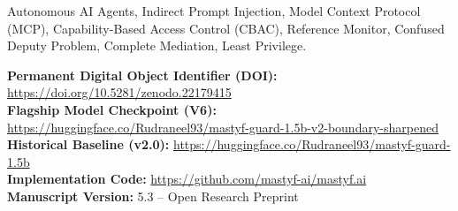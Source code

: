 \documentclass[10pt,journal,compsoc]{IEEEtran}
\begin{document}
{\begin{abstract}
pre-sealed holdout suite (75/75, SHA-256: \texttt{22bc736c...}), 98.43\% defense on the 4,216-instance InjecAgent evaluation used in this study ($P_{50}$: 267.7~ms), 92.44\% defense on AI Safety Bench (416/450 attacks blocked, 550/550 benign operations allowed), 99.52\% attack defense on interactive AgentDojo ($N = 629$) with exact clean-task utility parity (6/97 tasks) matching the unprotected base agent, and 100\% defense across 500 targeted adaptive red-team trials. Finally, we systemize the runtime into the Mastyf Security Gateway: the evaluated research runtime was v0.1.0-RC1 (verifying 38/38 security invariant tests), while the subsequently hardened commercial-pilot runtime is v0.1.1-rc1 (verifying 50/50 tests), establishing complete mediation non-executability ($\text{Decision} \in \{\text{BLOCK}, \text{ESCALATE}\} \implies \text{BackendToolInvocations} = 0$) and $>330,000$~req/s reference monitor throughput under an Ed25519-signed release manifest. We contextualize Mastyf as an empirically evaluated pre-production architecture, highlighting residual risks and outlining requirements for broader production-scale validation.
\end{abstract}

\begin{IEEEkeywords}
Autonomous AI Agents, Indirect Prompt Injection, Model Context Protocol (MCP), Capability-Based Access Control (CBAC), Reference Monitor, Confused Deputy Problem, Complete Mediation, Least Privilege.
\end{IEEEkeywords}}

\maketitle
\IEEEdisplaynontitleabstractindextext
\IEEEpeerreviewmaketitle

\noindent\textbf{Permanent Digital Object Identifier (DOI):} \url{https://doi.org/10.5281/zenodo.22179415}\\
\textbf{Flagship Model Checkpoint (V6):} \url{https://huggingface.co/Rudraneel93/mastyf-guard-1.5b-v2-boundary-sharpened}\\
\textbf{Historical Baseline (v2.0):} \url{https://huggingface.co/Rudraneel93/mastyf-guard-1.5b}\\
\textbf{Implementation Code:} \url{https://github.com/mastyf-ai/mastyf.ai}\\
\textbf{Manuscript Version:} 5.3 -- Open Research Preprint
\end{document}

